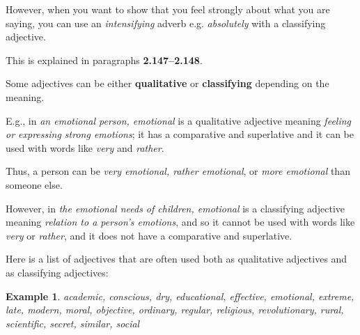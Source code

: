 \documentclass[oneside]{book}
\numberwithin{equation}{section}
\newtheorem{example}{Example}[section]
\begin{document}
%
However, when you want to show that you feel strongly about what you are saying, you can use an \textit{intensifying} adverb e.g. \textit{absolutely} with a classifying adjective.

This is explained in paragraphs \textbf{2.147--2.148}.

%
\noindent{} Some adjectives can be either \textbf{qualitative} or \textbf{classifying} depending on the meaning.

E.g., in \textit{an emotional person, emotional} is a qualitative adjective meaning \textit{feeling or expressing strong emotions}; it has a comparative and superlative and it can be used with words like \textit{very} and \textit{rather}.

Thus, a person can be \textit{very emotional, rather emotional}, or \textit{more emotional} than someone else.

However, in \textit{the emotional needs of children, emotional} is a classifying adjective meaning \textit{relation to a person's emotions}, and so it cannot be used with words like \textit{very} or \textit{rather}, and it does not have a comparative and superlative.

%
Here is a list of adjectives that are often used both as qualitative adjectives and as classifying adjectives:
\begin{example}
    academic, conscious, dry, educational, effective, emotional, extreme, late, modern, moral, objective, ordinary, regular, religious, revolutionary, rural, scientific, secret, similar, social
\end{example}
\end{document}
